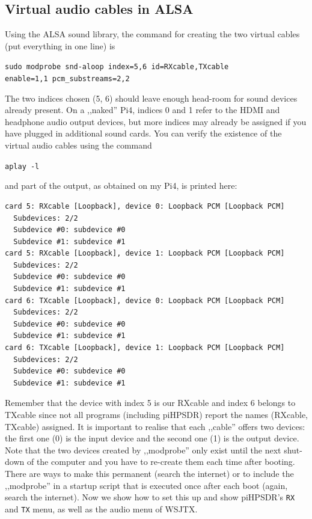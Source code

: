 \documentclass[12pt]{book}
\def\bltt#1{\texttt{\color{blue}#1}}
\def\pH{pi\-HPSDR\xspace}
\begin{document}
\subsection[ALSA: virtual audio cables]{Virtual audio cables in ALSA}
Using the ALSA sound library,
the command for creating the two virtual cables (put everything in one line) is

\texttt{sudo modprobe snd-aloop index=5,6 id=RXcable,TXcable\\
enable=1,1 pcm\_substreams=2,2}

The two indices chosen (5, 6) should leave enough head-room for sound devices
already present. On a ,,naked'' Pi4, indices 0 and 1 refer to the HDMI
and headphone audio output devices, but more indices may already be assigned
if you have plugged in additional sound cards. You can verify the existence of
the virtual audio cables using the command

\texttt{aplay -l}

and part of the output, as obtained on my Pi4, is printed here:

\begin{small}
\begin{verbatim}
card 5: RXcable [Loopback], device 0: Loopback PCM [Loopback PCM]
  Subdevices: 2/2
  Subdevice #0: subdevice #0
  Subdevice #1: subdevice #1
card 5: RXcable [Loopback], device 1: Loopback PCM [Loopback PCM]
  Subdevices: 2/2
  Subdevice #0: subdevice #0
  Subdevice #1: subdevice #1
card 6: TXcable [Loopback], device 0: Loopback PCM [Loopback PCM]
  Subdevices: 2/2
  Subdevice #0: subdevice #0
  Subdevice #1: subdevice #1
card 6: TXcable [Loopback], device 1: Loopback PCM [Loopback PCM]
  Subdevices: 2/2
  Subdevice #0: subdevice #0
  Subdevice #1: subdevice #1
\end{verbatim}
\end{small}
Remember that the device with index 5 is our RXcable and index 6 belongs to TXcable since
not all programs (including \pH) report the names (RXcable, TXcable) assigned. It is
important to realise that each ,,cable'' offers two devices: the first one (0) is
the input device and the second one (1) is the output device.
Note that
the two devices created by ,,modprobe'' only exist until the next shut-down of the computer and
you have to re-create them each time after booting. There are ways to make this permanent (search
the internet) or to include the ,,modprobe'' in a startup script that is executed once after each
boot (again, search the internet). Now we show how to set this up and show \pH's \bltt{RX} and
\bltt{TX} menu, as well as the audio menu of WSJTX.
\end{document}
